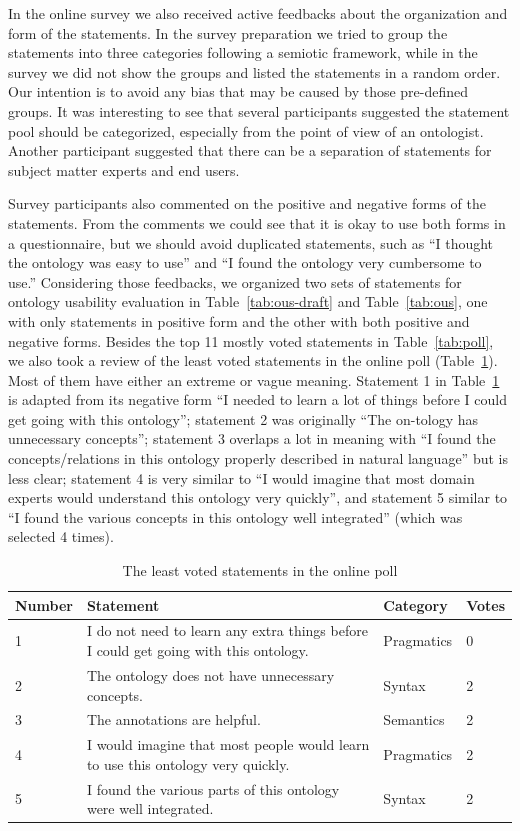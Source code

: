 In the online survey we also received active feedbacks about the organization and form of the statements. In the survey preparation we tried to group the statements into three categories following a semiotic framework, while in the survey we did not show the groups and listed the statements in a random order. Our intention is to avoid any bias that may be caused by those pre-defined groups. It was interesting to see that several participants suggested the statement pool should be categorized, especially from the point of view of an ontologist. Another participant suggested that there can be a separation of statements for subject matter experts and end users.

Survey participants also commented on the positive and negative forms of the statements. From the comments we could see that it is okay to use both forms in a questionnaire, but we should avoid duplicated statements, such as ``I thought the ontology was easy to use'' and ``I found the ontology very cumbersome to use.'' Considering those feedbacks, we organized two sets of statements for ontology usability evaluation in Table~\ref{tab:ous-draft} and Table~\ref{tab:ous}, one with only statements in positive form and the other with both positive and negative forms.
Besides the top 11 mostly voted statements in Table~\ref{tab:poll}, we also took a review of the least voted statements in the online poll (Table~\ref{tab:least}). Most of them have either an extreme or vague meaning. Statement 1 in Table~\ref{tab:least} is adapted from its negative form ``I needed to learn a lot of things before I could get going with this ontology''; statement 2 was originally ``The on-tology has unnecessary concepts''; statement 3 overlaps a lot in meaning with ``I found the concepts/relations in this ontology properly described in natural language'' but is less clear; statement 4 is very similar to ``I would imagine that most domain experts would understand this ontology very quickly'', and statement 5 similar to ``I found the various concepts in this ontology well integrated'' (which was selected 4 times).
\begin{table}
	\centering
\caption{The least voted statements in the online poll}
\label{tab:least}
\begin{tabular}{|p{}|p{}|p{}|p{}|}
	\hline Number & Statement & Category & Votes \\ 
	\hline 1 & I do not need to learn any extra things before I could get going with this ontology. & Pragmatics & 0 \\ 
	\hline 2 & The ontology does not have unnecessary concepts. & Syntax & 2 \\ 
	\hline 3 & The annotations are helpful. & Semantics & 2 \\ 
	\hline 4 & I would imagine that most people would learn to use this ontology very quickly. & Pragmatics & 2 \\ 
	\hline 5 & I found the various parts of this ontology were well integrated. & Syntax & 2 \\ 
	\hline 
\end{tabular} 
\end{table}

